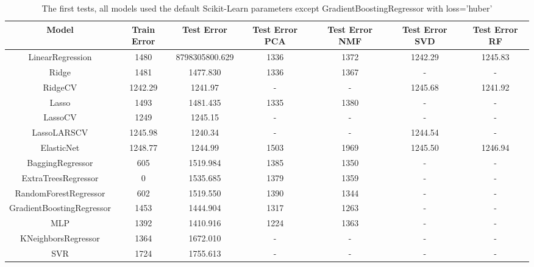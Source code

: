\documentclass[a4paper]{article}
\begin{document}
\begin{table}[H]
\begin{tabular}{ |c|c|c|c|c|c|c| }
\hline
Model                     & Train Error & Test Error     & Test Error PCA & Test Error NMF & Test Error SVD & Test Error RF \\
\hline
LinearRegression          & 1480        & 8798305800.629 & 1336            & 1372 & 1242.29 & 1245.83 \\
Ridge                     & 1481        & 1477.830       & 1336            & 1367 & -       & -       \\
RidgeCV                   & 1242.29     & 1241.97        & -               & -    & 1245.68 & 1241.92 \\
Lasso                     & 1493        & 1481.435       & 1335            & 1380 &    -    &    -    \\
LassoCV                   & 1249        & 1245.15        & -               &  -   &    -    &    -    \\
LassoLARSCV               & 1245.98     & 1240.34        & -               & -    & 1244.54 &    -    \\
ElasticNet                & 1248.77     & 1244.99        & 1503            & 1969 & 1245.50 & 1246.94 \\
BaggingRegressor          & 605         & 1519.984       & 1385            & 1350 & -       &    -    \\
ExtraTreesRegressor       & 0           & 1535.685       & 1379            & 1359 & -       &    -    \\
RandomForestRegressor     & 602         & 1519.550       & 1390            & 1344 & -       &    -    \\
GradientBoostingRegressor & 1453        & 1444.904       & 1317            & 1263 & -       &    -    \\
MLP                       & 1392        & 1410.916       & 1224            & 1363 & -       &    -    \\
KNeighborsRegressor       & 1364        & 1672.010       & -               & -    & -       &    -    \\
SVR                       & 1724        & 1755.613       & -               & -    & -       &    -    \\
\hline
\end{tabular}
\caption{\label{tab:start}The first tests, all models used the default Scikit-Learn parameters except GradientBoostingRegressor with loss='huber'}
\end{table}
\end{document}
